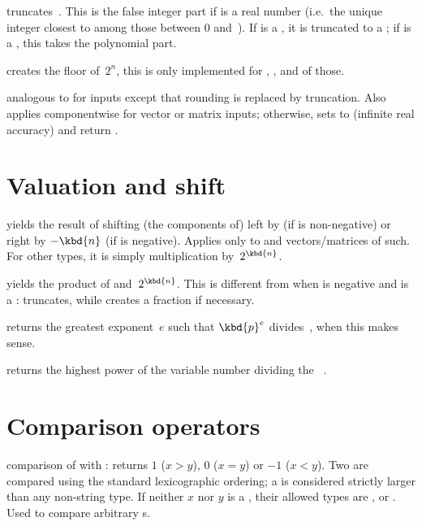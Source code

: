  truncates~. This is the false integer part
if  is a real number (i.e.~the unique integer closest to  among
those between 0 and~). If  is a , it is truncated
to a ; if  is a , this takes the polynomial part.

 creates the floor of~$2^n$, this is
only implemented for , ,  and  of
those.

 analogous to  for
 inputs except that rounding is replaced by truncation. Also applies
componentwise for vector or matrix inputs; otherwise, sets  to
 (infinite real accuracy) and return .

\section{Valuation and shift}

 yields the result of shifting
(the components of)  left by  (if  is non-negative)
or right by $-\kbd{n}$ (if  is negative). Applies only to 
and vectors/matrices of such. For other types, it is simply multiplication
by~$2^{\kbd{n}}$.

 yields the product of 
and~$2^{\kbd{n}}$. This is different from  when  is negative
and  is a :  truncates, while 
creates a fraction if necessary.

 returns the greatest exponent~$e$ such that
$\kbd{p}^e$ divides~, when this makes sense.

 returns the highest power of the variable
number  dividing the ~.

\section{Comparison operators}


 comparison of  with : returns
$1$ ($x > y$), $0$ ($x = y$) or $-1$ ($x < y$). Two 
are compared using the standard lexicographic ordering; a 
is considered strictly larger than any non-string type. If neither
$x$ nor $y$ is a , their allowed types are , 
or . Used  to compare arbitrary s.

